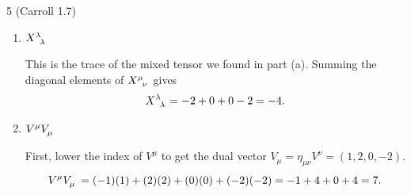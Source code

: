 \documentclass[11pt]{article}
\begin{document}
\begin{problem}{5 (Carroll 1.7)}
\begin{enumerate}[label=(\alph*)]
\begin{answer}
\begin{equation}
		      \end{equation}
		      Now we antisymmetrize, \( \frac{1}{2}(\tensor{X}{_{\mu\nu}} - \tensor{X}{_{\nu\mu}}) \),
		      \begin{equation}
            \begin{aligned}
		      \tensor{X}{_{[\mu\nu]}} &= \frac{1}{2} \left[ \begin{pmatrix}
		          2 & 0 & -1 & 1 \\
		          1 & 0 & 3 & 2 \\
		          1 & 1 & 0 & 0 \\
		          2 & 1 & 1 & -2
		      \end{pmatrix} -
		      \begin{pmatrix}
		          2 & 1 & 1 & 2 \\
		          0 & 0 & 1 & 1 \\
		          -1 & 3 & 0 & 1 \\
		          1 & 2 & 0 & -2
		      \end{pmatrix} \right] \\ &=
		      \begin{pmatrix}
		          0 & -1/2 & -1 & -1/2 \\
		          1/2 & 0 & 1 & 1/2 \\
		          1 & -1 & 0 & -1/2 \\
		          1/2 & -1/2 & 1/2 & 0
		      \end{pmatrix}.
              \end{aligned}
		      \end{equation}
		      \end{answer}
		\item \( \tensor{X}{^{\lambda}_{\lambda}} \)
\begin{answer}
  This is the trace of the mixed tensor we found in part (a).
  Summing the diagonal elements of \( \tensor{X}{^{\mu}_{\nu}} \) gives
		      \begin{equation}
		      \tensor{X}{^{\lambda}_{\lambda}} = -2 + 0 + 0 - 2 = -4.
		      \end{equation}
		      \end{answer}
		\item \( \tensor{V}{^{\mu}_{}}\tensor{V}{^{}_{\mu}} \)
\begin{answer}
  First, lower the index of \( V^\mu \) to get the dual vector \( V_\mu = \eta_{\mu\nu} V^\nu = (1, 2, 0, -2)\).
		      \begin{equation}
		      \tensor{V}{^{\mu}}\tensor{V}{_{\mu}} = (-1)(1) + (2)(2) + (0)(0) + (-2)(-2) = -1 + 4 + 0 + 4 = 7.

\end{equation}
\end{answer}
\end{enumerate}
\end{problem}
\end{document}
